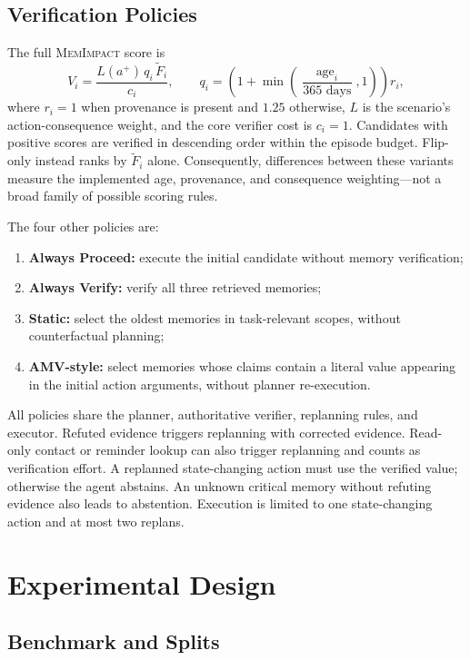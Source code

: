 \documentclass[11pt]{article}
\newcommand{\method}{\textsc{MemImpact}\xspace}
\begin{document}
\subsection{Verification Policies}

The full \method score is
\begin{equation}
V_i=\frac{L(a^{+})\,q_i\,\widetilde F_i}{c_i},
\qquad
q_i=\left(1+\min\left(\frac{\operatorname{age}_i}{365\text{ days}},1\right)\right)r_i,
\end{equation}
where $r_i=1$ when provenance is present and $1.25$ otherwise, $L$ is the scenario's action-consequence weight, and the core verifier cost is $c_i=1$. Candidates with positive scores are verified in descending order within the episode budget. Flip-only instead ranks by $\widetilde F_i$ alone. Consequently, differences between these variants measure the implemented age, provenance, and consequence weighting---not a broad family of possible scoring rules.

The four other policies are:
\begin{enumerate}
  \item \textbf{Always Proceed:} execute the initial candidate without memory verification;
  \item \textbf{Always Verify:} verify all three retrieved memories;
  \item \textbf{Static:} select the oldest memories in task-relevant scopes, without counterfactual planning;
  \item \textbf{AMV-style:} select memories whose claims contain a literal value appearing in the initial action arguments, without planner re-execution.
\end{enumerate}
All policies share the planner, authoritative verifier, replanning rules, and executor. Refuted evidence triggers replanning with corrected evidence. Read-only contact or reminder lookup can also trigger replanning and counts as verification effort. A replanned state-changing action must use the verified value; otherwise the agent abstains. An unknown critical memory without refuting evidence also leads to abstention. Execution is limited to one state-changing action and at most two replans.

\section{Experimental Design}

\subsection{Benchmark and Splits}
\end{document}
